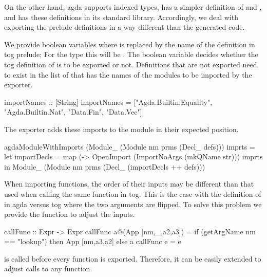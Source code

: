 On the other hand, agda supports indexed types, has a simpler definition of  and , and has these definitions in its standard library. Accordingly, we deal with exporting the prelude definitions in a way different than the generated code. 

We provide boolean variables  where  is replaced by the name of the definition in tog prelude; For the  type this will be . The boolean variable decides whether the tog definition of  is to be exported or not. Definitions that are not exported need to exist in the list of  that has the names of the modules to be imported by the exporter. 
\begin{hscode}
importNames :: [String]
importNames =
  ["Agda.Builtin.Equality",
   "Agda.Builtin.Nat",
   "Data.Fin", 
   "Data.Vec"]
\end{hscode}
The exporter adds these imports to the module in their expected position.  
\begin{hscode}
agdaModuleWithImports (Module_ (Module nm prms (Decl_ defs))) imprts =
  let importDecls = 
      map (\str -> OpenImport (ImportNoArgs (mkQName str))) imprts 
  in Module_ (Module nm prms (Decl_ (importDecls ++ defs)))
\end{hscode} 

\begin{comment}
In agda, \lstmath{Fin} is defined as 
\begin{agdacode}
data Fin : ~$\mathbb{N}$~ ~$\rightarrow$~ Set where
zero : {n : ~$\mathbb{N}$~} ~$\rightarrow$~ Fin (suc n)
suc  : {n : ~$\mathbb{N}$~} (i : Fin n) ~$\rightarrow$~ Fin (suc n)
\end{agdacode}
\end{comment} 
When importing functions, the order of their inputs may be different than that used when calling the same function in tog. This is the case with the definition of  in agda versus tog where the two arguments are flipped. To solve this problem we provide the  function to adjust the inputs. 
\begin{hscode}
callFunc :: Expr -> Expr
callFunc a@(App [nm,_,a2,a3]) =
  if (getArgName nm == "lookup") then App [nm,a3,a2] else a
callFunc e = e
\end{hscode}
 is called before every function is exported. Therefore, it can be easily extended to adjust calls to any function. 

